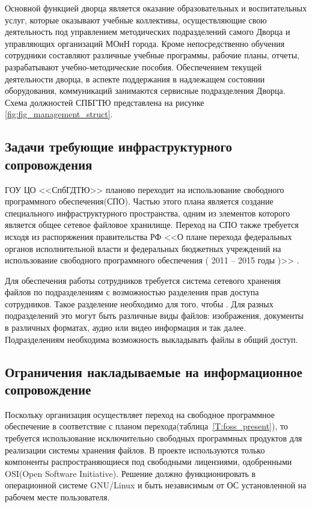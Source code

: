 \documentclass[utf8,usehyperref,12pt]{G7-32}
\begin{document}
Основной функцией дворца является оказание образовательных и воспитательных услуг, которые оказывают учебные коллективы, осуществляющие свою деятельность под управлением методических подразделений самого Дворца
и управляющих организаций МОиН города. Кроме непосредственно обучения сотрудники  составляют различные учебные программы, рабочие планы, отчеты, разрабатывают учебно-методические пособия.
Обеспечением текущей деятельности дворца, в аспекте поддержания в надлежащем состоянии оборудования, коммуникаций занимаются сервисные подразделения Дворца. Схема должностей СПБГТЮ представлена на рисунке \ref{fig:fig_management_struct}.

\subsection{Задачи требующие инфраструктурного сопровождения}\label{ssect:tasks_infra}

ГОУ ЦО <<СпбГДТЮ>> планово\cite{foss_present} переходит на использование свободного программного обеспечения(СПО). Частью этого плана является создание специального инфраструктурного пространства, одним из элементов которого является общее сетевое файловое хранилище. Переход на СПО также требуется исходя из распоряжения правительства РФ <<О плане перехода федеральных органов исполнительной власти и федеральных бюджетных учреждений на использование свободного программного обеспечения ( 2011 -- 2015 годы )>> \cite{foss_migrate}.

Для обеспечения работы сотрудников требуется система сетевого хранения файлов по подразделениям с возможностью разделения прав доступа сотрудников. Такое разделение необходимо для того, чтобы . Для разных подразделений это могут быть различные виды файлов: изображения, документы в различных форматах, аудио или видео информация и так далее. Подразделениям необходима возможность выкладывать файлы в общий доступ.

\subsection{Ограничения накладываемые на информационное сопровождение}\label{ssect:restrict_infra}
Поскольку организация осуществляет переход на свободное программное обеспечение в соответствие с планом перехода(таблица~\ref{T:foss_present}), то требуется использование исключительно свободных программных продуктов для реализации системы хранения файлов. В проекте используются только компоненты распространяющиеся под свободными лицензиями, одобренными OSI(Open Software Initiative). Решение должно функционировать в операционной системе GNU/Linux и быть независимым от ОС установленной на рабочем месте пользователя.
\end{document}
